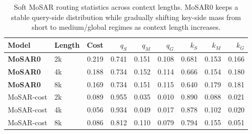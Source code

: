 \begin{table}[t]
\centering
\scriptsize
\setlength{\tabcolsep}{3pt}
\begin{tabular}{llrrrrrrr}
\toprule
Model & Length & Cost & $q_S$ & $q_M$ & $q_G$ & $k_S$ & $k_M$ & $k_G$ \\
\midrule
\textbf{MoSAR0} & 2k & 0.219 & 0.741 & 0.151 & 0.108 & 0.681 & 0.153 & 0.166 \\
\textbf{MoSAR0} & 4k & 0.188 & 0.734 & 0.152 & 0.114 & 0.666 & 0.154 & 0.180 \\
\textbf{MoSAR0} & 8k & 0.169 & 0.734 & 0.151 & 0.115 & 0.640 & 0.179 & 0.181 \\
\midrule
MoSAR-cost & 2k & 0.089 & 0.955 & 0.035 & 0.010 & 0.890 & 0.088 & 0.021 \\
MoSAR-cost & 4k & 0.056 & 0.934 & 0.049 & 0.017 & 0.878 & 0.102 & 0.020 \\
MoSAR-cost & 8k & 0.086 & 0.812 & 0.110 & 0.079 & 0.794 & 0.155 & 0.051 \\
\bottomrule
\end{tabular}
\caption{
Soft MoSAR routing statistics across context lengths. 
MoSAR0 keeps a stable query-side distribution while gradually shifting key-side mass from short to medium/global regimes as context length increases.
}
\label{tab:mosar-routing}
\end{table}
